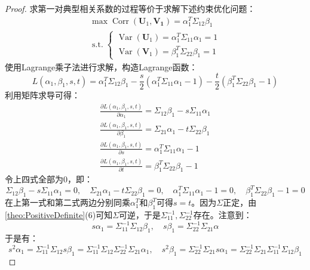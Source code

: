 \begin{proof}
	求第一对典型相关系数的过程等价于求解下述约束优化问题：
	\begin{gather*}
		\max\operatorname{Corr}(\mathbf{U}_1,\mathbf{V_1})=\alpha_1^T\Sigma_{12}\beta_1 \\
		\operatorname{s.t.}
		\begin{cases}
			\operatorname{Var}(\mathbf{U}_1)=\alpha_1^T\Sigma_{11}\alpha_1=1 \\
			\operatorname{Var}(\mathbf{V}_1)=\beta_1^T\Sigma_{22}\beta_1=1
		\end{cases}
	\end{gather*}
	使用Lagrange乘子法进行求解，构造Lagrange函数：
	\begin{equation*}
		L(\alpha_1,\beta_1,s,t)=\alpha_1^T\Sigma_{12}\beta_1-\frac{s}{2}(\alpha_1^T\Sigma_{11}\alpha_1-1)-\frac{t}{2}(\beta_1^T\Sigma_{22}\beta_1-1)
	\end{equation*}
	利用矩阵求导可得：
	\begin{gather*}
		\frac{\partial L(\alpha_1,\beta_1,s,t)}{\partial\alpha_1}=\Sigma_{12}\beta_1-s\Sigma_{11}\alpha_1 \\
		\frac{\partial L(\alpha_1,\beta_1,s,t)}{\partial\beta_1}=\Sigma_{21}\alpha_1-t\Sigma_{22}\beta_1 \\
		\frac{\partial L(\alpha_1,\beta_1,s,t)}{\partial s}=\alpha_1^T\Sigma_{11}\alpha_1-1 \\
		\frac{\partial L(\alpha_1,\beta_1,s,t)}{\partial t}=\beta_1^T\Sigma_{22}\beta_1-1
	\end{gather*}
	令上四式全部为$0$，即：
	\begin{equation*}
		\Sigma_{12}\beta_1-s\Sigma_{11}\alpha_1=0,\quad\Sigma_{21}\alpha_1-t\Sigma_{22}\beta_1=0,\quad\alpha_1^T\Sigma_{11}\alpha_1-1=0,\quad\beta_1^T\Sigma_{22}\beta_1-1=0
	\end{equation*}
	在上第一式和第二式两边分别同乘$\alpha_1^T$和$\beta_1^T$可得$s=t$。因为$\Sigma$正定，由\cref{theo:PositiveDefinite}(6)可知$\Sigma$可逆，于是$\Sigma_{11}^{-1},\Sigma_{22}^{-1}$存在。注意到：
	\begin{equation*}
		s\alpha_1=\Sigma_{11}^{-1}\Sigma_{12}\beta_1,\quad s\beta_1=\Sigma_{22}^{-1}\Sigma_{21}\alpha
	\end{equation*}
	于是有：
	\begin{equation*}
		s^2\alpha_1=\Sigma_{11}^{-1}\Sigma_{12}s\beta_1=\Sigma_{11}^{-1}\Sigma_{12}\Sigma_{22}^{-1}\Sigma_{21}\alpha_1,\quad
		s^2\beta_1=\Sigma_{22}^{-1}\Sigma_{21}s\alpha_1=\Sigma_{22}^{-1}\Sigma_{21}\Sigma_{11}^{-1}\Sigma_{12}\beta_1

\end{equation*}
\end{proof}
